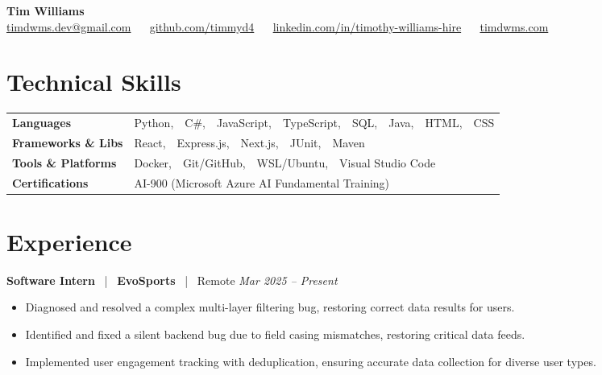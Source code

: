 \documentclass[10pt, letterpaper]{article}
\newcommand{\jobhead}[4]{%
  \vspace{5pt}%
  {\bfseries\color{dark}#1}%
  ~{\color{light}|}~%
  {\bfseries\color{navy}#2}%
  ~{\color{light}|}~%
  {\color{light}#3}%
  \hfill{\color{light}\small\textit{#4}}\\[-2pt]%
}
\newcommand{\skillrow}[2]{%
  {\bfseries #1} & #2 \\[2pt]%
}
\begin{document}

\begin{center}
  {\huge\bfseries\color{navy} Tim Williams}\\[4pt]
  {\small\color{light}
    \href{mailto:timdwms.dev@gmail.com}{timdwms.dev@gmail.com}
    ~\textbullet~
    \href{https://github.com/timmyd4}{github.com/timmyd4}
    ~\textbullet~
    \href{https://www.linkedin.com/in/timothy-williams-hire}{linkedin.com/in/timothy-williams-hire}
    ~\textbullet~
    \href{https://timdwms.com}{timdwms.com}
  }
\end{center}

\vspace{2pt}

\section{Technical Skills}

\begin{tabular}{@{}p{1.6in} p{5.2in}@{}}
  \skillrow{Languages}{Python,\ \ C\#,\ \ JavaScript,\ \ TypeScript,\ \ SQL,\ \ Java,\ \ HTML,\ \ CSS}
  \skillrow{Frameworks \& Libs}{React,\ \ Express.js,\ \ Next.js,\ \ JUnit,\ \ Maven}
  \skillrow{Tools \& Platforms}{Docker,\ \ Git/GitHub,\ \ WSL/Ubuntu,\ \ Visual Studio Code}
  \skillrow{Certifications}{AI-900 (Microsoft Azure AI Fundamental Training)}
\end{tabular}

\section{Experience}

\jobhead{Software Intern}{EvoSports}{Remote}{Mar 2025 – Present}
\begin{itemize}
  \item Diagnosed and resolved a complex multi-layer filtering bug, restoring correct data results for users.
  \item Identified and fixed a silent backend bug due to field casing mismatches, restoring critical data feeds.
  \item Implemented user engagement tracking with deduplication, ensuring accurate data collection for diverse user types.
\end{itemize}
\end{document}
